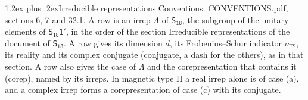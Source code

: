 \documentclass[10pt,a4paper]{article}
\makeatletter
\renewcommand\section{\@startsection{section}{1}{\z@}{-3ex plus -1ex minus -.2ex}%
  {1.2ex plus .2ex}{\normalfont\large\sffamily\bfseries\color{parttitle}}}
\numberwithin{equation}{section}
\newcommand{\grp}[1]{\mathsf{#1}}
\newcommand{\fsind}{\nu_{\mathrm{FS}}}
\makeatother
\begin{document}
\section{Irreducible representations}\label{s:irreps}
Conventions: \href{../../CONVENTIONS.pdf}{CONVENTIONS.pdf}, sections \href{../../../rotation/CONVENTIONS.pdf\#conv.6}{6}, \href{../../../rotation/CONVENTIONS.pdf\#conv.7}{7} and \href{../../CONVENTIONS.pdf\#conv.32.1}{32.1}.
\leavevmode\label{n:irrep.Delta}A row is an irrep $\Lambda$ of $\grp{S_{18}}$, the subgroup of the unitary elements of $\grp{S_{18}1'}$, in the order of the section Irreducible representations of the document of \href{../../../rotation/data/pdf/S18.pdf}{$\grp{S_{18}}$}. \label{n:index.dimension}\label{n:index.frobenius}\label{n:head.irrep}\label{n:head.reality}\label{n:head.conjugate}A row gives its dimension $d$, its Frobenius--Schur indicator $\fsind$, its reality and its complex conjugate (conjugate, a dash for the others), as in that section. \label{n:head.case.corep}\label{n:head.corep}A row also gives the case of $\Lambda$ and the corepresentation that contains it (corep), named by its irreps. In magnetic type II a real irrep alone is of case (a), and a complex irrep forms a corepresentation of case (c) with its conjugate.
\setlength{\emergencystretch}{2em}\par\setlength{\emergencystretch}{0pt}
\end{document}

